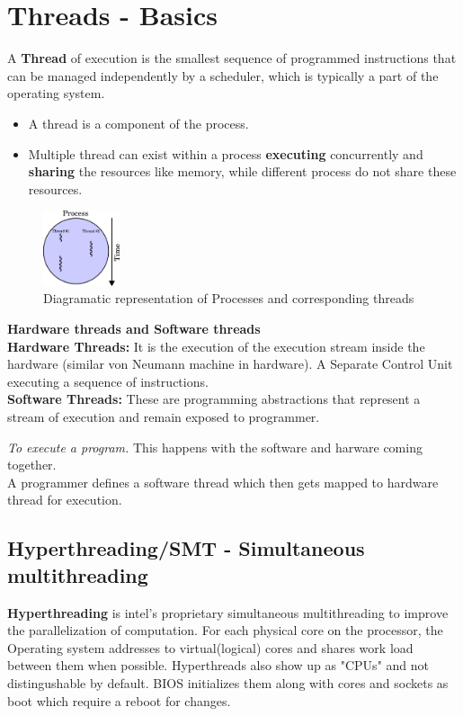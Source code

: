 \documentclass[12pt, a4paper]{report}
\begin{document}
\section{Threads - Basics}
A {\bfseries{Thread}} of execution is the smallest sequence of programmed instructions that can be managed independently 
by a scheduler, which is typically a part of the operating system. 

\begin{itemize}
    \item A thread is a component of the process.
    \item Multiple thread can exist within a process {\bfseries executing} concurrently and {\bfseries sharing} the 
          resources like memory, while different process do not share these resources.
\end{itemize}

\begin{figure}[h]
    \centering
    \includegraphics[width=0.20\textwidth]{Multithreadedprocess}
    \caption{Diagramatic representation of Processes and corresponding threads}
    \label{fig:Threads}
\end{figure}

{\large{\bfseries{Hardware threads and Software threads}}}\\
{\bfseries{Hardware Threads:}}
It is the execution of the execution stream inside the hardware (similar von Neumann machine in hardware). A Separate 
Control Unit executing a sequence of instructions.\\

{\bfseries{Software Threads:}}
These are programming abstractions that represent a stream of execution and remain exposed to programmer.

{\textit {To execute a program.}} This happens with the software and harware coming together. \\
A programmer defines a software thread which then gets mapped to hardware thread for execution.


\subsection{Hyperthreading/SMT - Simultaneous multithreading}
{\bfseries{Hyperthreading}} is intel's proprietary simultaneous multithreading to improve the parallelization of
computation.
For each physical core on the processor, the Operating system addresses to virtual(logical) cores and shares work load
between them when possible. Hyperthreads also show up as "CPUs" and not distingushable by default. BIOS initializes them
along with cores and sockets as boot which require a reboot for changes. 
\end{document}
